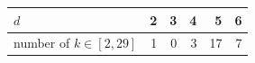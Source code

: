 \begin{tabular}{@{}lrrrrr@{}}\toprule $d$ & 2 & 3 & 4 & 5 & 6\\\midrule number of $k\in[2,29]$ & 1 & 0 & 3 & 17 & 7\\\bottomrule\end{tabular}
